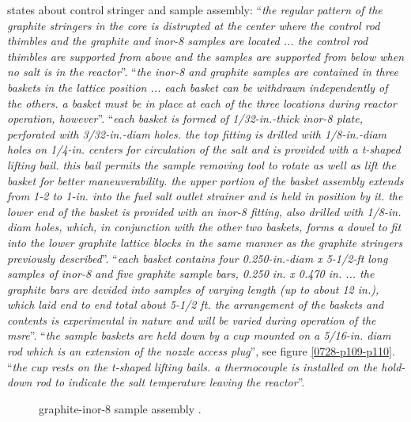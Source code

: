 \documentclass[ms,a4paper]{memoir}
\newcommand*{\mrsarchive}{../../msr-archive}%
\begin{document}
\parencite[page 81 and 84]{ornl-tm-0728} states about control stringer and sample assembly:
\enquote{\textit{the regular pattern of the graphite stringers in the core is distrupted at the center where the control rod thimbles and the graphite and inor-8 samples are located ... the control rod thimbles are supported from above and the samples are supported from below when no salt is in the reactor}}.
\enquote{\textit{the inor-8 and graphite samples are contained in three baskets in the lattice position ... each basket can be withdrawn independently of the others. a basket must be in place at each of the three locations during reactor operation, however}}.
\enquote{\textit{each basket is formed of 1/32-in.-thick inor-8 plate, perforated with 3/32-in.-diam holes. the top fitting is drilled with 1/8-in.-diam holes on 1/4-in. centers for circulation of the salt and is provided with a t-shaped lifting bail. this bail permits the sample removing tool to rotate as well as lift the basket for better maneuverability. the upper portion of the basket assembly extends from 1-2 to 1-in. into the fuel salt outlet strainer and is held in position by it. the lower end of the basket is provided with an inor-8 fitting, also drilled with 1/8-in. diam holes, which, in conjunction with the other two baskets, forms a dowel to fit into the lower graphite lattice blocks in the same manner as the graphite stringers previously described}}.
\enquote{\textit{each basket contains four 0.250-in.-diam x 5-1/2-ft long samples of inor-8 and five graphite sample bars, 0.250 in. x 0.470 in. ... the graphite bars are devided into samples of varying length (up to about 12 in.), which laid end to end total about 5-1/2 ft. the arrangement of the baskets and contents is experimental in nature and will be varied during operation of the msre}}.
\enquote{\textit{the sample baskets are held down by a cup mounted on a 5/16-in. diam rod which is an extension of the nozzle access plug}}, see figure \ref{0728-p109-p110}.
\enquote{\textit{the cup rests on the t-shaped lifting bails. a thermocouple is installed on the hold-down rod to indicate the salt temperature leaving the reactor}}.


\begin{figure}[H]
  \centering
  \caption{graphite-inor-8 sample assembly \parencite[figure 5.8]{ornl-tm-0728}.}
  \label{0728-fig5-8}
\end{figure}
\end{document}

